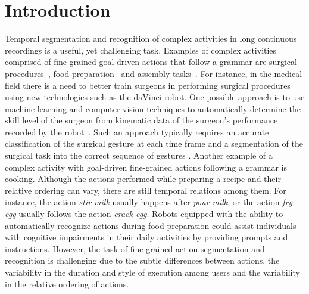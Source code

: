 \documentclass[10pt,twocolumn,letterpaper]{article}
\begin{document}
\section{Introduction}

Temporal segmentation and recognition of complex activities in long continuous recordings is a useful, yet challenging task. Examples of complex activities comprised of fine-grained goal-driven actions that follow a grammar are surgical procedures~\cite{Gao2014}, food preparation~\cite{Stein:UbiComp13} and assembly tasks~\cite{Vo:CVPR14}. For instance, in the medical field there is a need to better train surgeons in performing surgical procedures using new technologies such as the daVinci robot. One possible approach is to use machine learning and computer vision techniques to automatically determine the skill level of the surgeon from kinematic data of the surgeon's performance recorded by the robot~\cite{Gao2014}. Such an approach typically requires an accurate classification of the surgical gesture at each time frame \cite{Bejar:MICCAI12} and a segmentation of the surgical task into the correct sequence of gestures \cite{Tao:MICCAI13}. Another example of a complex activity with goal-driven fine-grained actions following a grammar is cooking. Although the actions performed while preparing a recipe and their relative ordering can vary, there are still temporal relations among them. For instance, the action \emph{stir milk} usually happens after \emph{pour milk}, or the action \emph{fry egg} usually follows the action \emph{crack egg}. Robots equipped with the ability to automatically recognize actions during food preparation could assist individuals with cognitive impairments in their daily activities by providing prompts and instructions. However, the task of fine-grained action segmentation and recognition is challenging due to the subtle differences between actions, the variability in the duration and style of execution among users and the variability in the relative ordering of actions.
\end{document}
